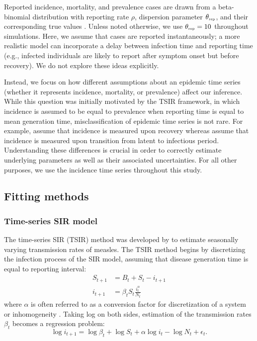 \documentclass{article}
\newcommand{\tsub}[2]{#1_{{\textrm{\tiny #2}}}}
\begin{document}
Reported incidence, mortality, and prevalence cases are drawn from a beta-binomial distribution with reporting rate $\rho$, dispersion parameter $\tsub{\theta}{rep}$, and their corresponding true values \citep{morris1997disentangling}.
Unless noted otherwise, we use $\tsub{\theta}{rep} = 10$ throughout simulations.
Here, we assume that cases are reported instantaneously; 
a more realistic model can incorporate a delay between infection time and reporting time (e.g., infected individuals are likely to report after symptom onset but before recovery).
We do not explore these ideas explicitly.

Instead, we focus on how different assumptions about an epidemic time series (whether it represents incidence, mortality, or prevalence) affect our inference.
While this question was initially motivated by the TSIR framework, in which incidence is assumed to be equal to prevalence when reporting time is equal to mean generation time, 
misclassification of epidemic time series is not rare.
For example, \cite{he2009plug} assume that incidence is measured upon recovery whereas \cite{hooker2010parameterizing, althaus2014estimating} assume that incidence is measured upon transition from latent to infectious period.
Understanding these differences is crucial in order to correctly estimate underlying parameters as well as their associated uncertainties.
For all other purposes, we use the incidence time series throughout this study.

\subsection{Fitting methods}

\subsubsection*{Time-series SIR model}

The time-series SIR (TSIR) method was developed by \cite{finkenstadt2000time} to estimate seasonally varying transmission rates of measles.
The TSIR method begins by discretizing the infection process of the SIR model, assuming that disease generation time is equal to reporting interval:
\begin{equation}\label{eq:tsir_dynamics}
\begin{aligned}
S_{t+1} &= B_t + S_t - i_{t+1}\\
i_{t+1} &= \beta_t S_t \frac{i_t^\alpha}{N_t}
\end{aligned}
\end{equation}
where $\alpha$ is often referred to as a conversion factor for discretization of a system or inhomogeneity \citep{liu1986influence, bjornstad2002dynamics, glass2003interpreting}.
Taking log on both sides, estimation of the transmission rates $\beta_t$ becomes a regression problem:
\begin{equation}\label{eq:tsir}
\log i_{t + 1} = \log \beta_t + \log S_t + \alpha \log i_t - \log N_t + \epsilon_t.
\end{equation}
\end{document}
